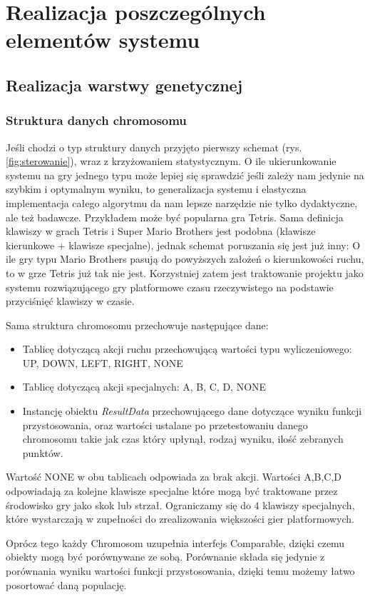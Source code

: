 \section{Realizacja poszczególnych elementów systemu}
\subsection{Realizacja warstwy genetycznej}
\subsubsection{Struktura danych chromosomu}
\begin{par}
	Jeśli chodzi o typ struktury danych przyjęto pierwszy schemat (rys.\ref{fig:sterowanie}), wraz z krzyżowaniem statystycznym. 
	O ile ukierunkowanie systemu na gry jednego typu może lepiej się sprawdzić jeśli zależy nam
	jedynie na szybkim i optymalnym wyniku, to generalizacja systemu i elastyczna implementacja całego algorytmu da nam lepsze narzędzie nie tylko dydaktyczne, ale też badawcze.
	Przykładem może być popularna gra Tetris. Sama definicja klawiszy w grach Tetris i Super Mario Brothers jest podobna (klawisze kierunkowe + klawisze specjalne),
	jednak schemat poruszania się jest już inny: O ile gry typu Mario Brothers pasują do powyższych założeń o kierunkowości ruchu, to w grze Tetris już tak nie jest.
	Korzystniej zatem jest traktowanie projektu jako systemu rozwiązującego gry platformowe czasu rzeczywistego na podstawie przyciśnięć klawiszy w czasie.
\end{par}
\begin{par}
	
	Sama struktura chromosomu przechowuje następujące dane:

	\begin{itemize}
		\item Tablicę dotyczącą akcji ruchu przechowującą wartości typu wyliczeniowego: UP, DOWN, LEFT, RIGHT, NONE
		\item Tablicę dotyczącą akcji specjalnych: A, B, C, D, NONE
		\item Instancję obiektu \textit{ResultData} przechowującego dane dotyczące wyniku funkcji przystosowania, oraz wartości ustalane po przetestowaniu danego chromosomu takie jak czas który upłynął, rodzaj wyniku, ilość zebranych punktów.
	\end{itemize}

	Wartość NONE w obu tablicach odpowiada za brak akcji. 
	Wartości A,B,C,D odpowiadają za kolejne klawisze specjalne które mogą być traktowane przez środowisko gry jako skok lub strzał. 
	Ograniczamy się do 4 klawiszy specjalnych, które wystarczają w zupełności do zrealizowania większości gier platformowych.

	Oprócz tego każdy Chromosom uzupełnia interfejs Comparable, dzięki czemu obiekty mogą być porównywane ze sobą. Porównanie składa się jedynie z porównania wyniku wartości funkcji przystosowania, dzięki temu możemy łatwo posortować daną populację.
\end{par}
